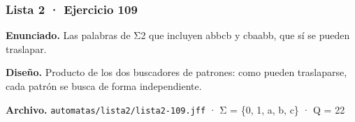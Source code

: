 
\hypertarget{lista-2-ejercicio-109}{%
\subsubsection{Lista 2 · Ejercicio 109}\label{lista-2-ejercicio-109}}

\textbf{Enunciado.} Las palabras de Σ2 que incluyen abbcb y cbaabb, que sí se pueden traslapar.

\textbf{Diseño.} Producto de los dos buscadores de patrones: como pueden traslaparse, cada patrón se busca de forma independiente.

\textbf{Archivo.} \texttt{automatas/lista2/lista2-109.jff} · Σ = \{0, 1, a, b, c\} · \textbar Q\textbar{} = 22

